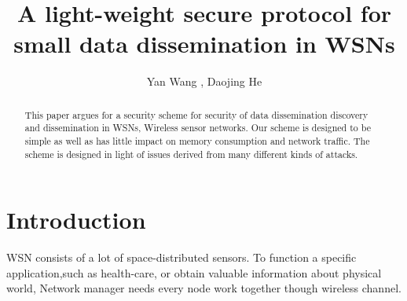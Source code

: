 \documentclass[lnicst,sechang,a4paper]{svmultln}
\begin{document}
\mainmatter  %

\title{A light-weight secure protocol for small data dissemination in WSNs}


%
%
\author{Yan Wang%
, Daojing He \Envelope
}  %


%
%

\maketitle


\begin{abstract}


This paper argues for a security scheme for security of data dissemination discovery and dissemination in WSNs, Wireless sensor networks. Our scheme is designed to be simple as well as has little impact on memory consumption and network traffic. The scheme is designed in light of issues derived from many different kinds of attacks.

\end{abstract}
\section{Introduction}
\cite{jour}
WSN consists of a lot of space-distributed sensors. To function a specific application,such as health-care, or obtain valuable information about physical world, Network manager needs every node work together though wireless channel.
\end{document}

